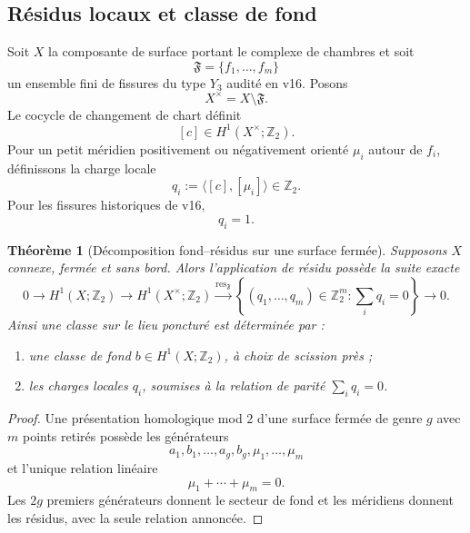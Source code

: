 \documentclass[11pt,a4paper]{article}
\newtheorem{theorem}{Théorème}[section]
\begin{document}
\subsection{Résidus locaux et classe de fond}

Soit $X$ la composante de surface portant le complexe de chambres et soit
\[
 \mathfrak F=\{f_1,\ldots,f_m\}
\]
un ensemble fini de fissures du type $Y_3$ audité en v16. Posons
\[
 X^\times=X\setminus\mathfrak F.
\]
Le cocycle de changement de chart définit
\[
 [c]\in H^1(X^\times;\mathbb Z_2).
\]
Pour un petit méridien positivement ou négativement orienté $\mu_i$ autour de $f_i$, définissons la charge locale
\begin{equation}\label{eq:v18-local-charge}
 \boxed{q_i:=\langle[c],[\mu_i]\rangle\in\mathbb Z_2.}
\end{equation}
Pour les fissures historiques de v16,
\[
 \boxed{q_i=1.}
\]

\begin{theorem}[Décomposition fond--résidus sur une surface fermée]\label{thm:v18-closed-exact-sequence}
Supposons $X$ connexe, fermée et sans bord. Alors l'application de résidu possède la suite exacte
\begin{equation}\label{eq:v18-exact-sequence}
 \boxed{
 0\longrightarrow H^1(X;\mathbb Z_2)
 \longrightarrow H^1(X^\times;\mathbb Z_2)
 \stackrel{\operatorname{res}_{\mathfrak F}}{\longrightarrow}
 \left\{(q_1,\ldots,q_m)\in\mathbb Z_2^m:\sum_iq_i=0\right\}
 \longrightarrow0.}
\end{equation}
Ainsi une classe sur le lieu poncturé est déterminée par :
\begin{enumerate}[label=\textup{(\roman*)}]
\item une classe de fond $b\in H^1(X;\mathbb Z_2)$, à choix de scission près ;
\item les charges locales $q_i$, soumises à la relation de parité $\sum_iq_i=0$.
\end{enumerate}
\end{theorem}

\begin{proof}
Une présentation homologique mod $2$ d'une surface fermée de genre $g$ avec $m$ points retirés possède les générateurs
\[
 a_1,b_1,\ldots,a_g,b_g,\mu_1,\ldots,\mu_m
\]
et l'unique relation linéaire
\[
 \mu_1+\cdots+\mu_m=0.
\]
Les $2g$ premiers générateurs donnent le secteur de fond et les méridiens donnent les résidus, avec la seule relation annoncée.
\end{proof}
\end{document}
